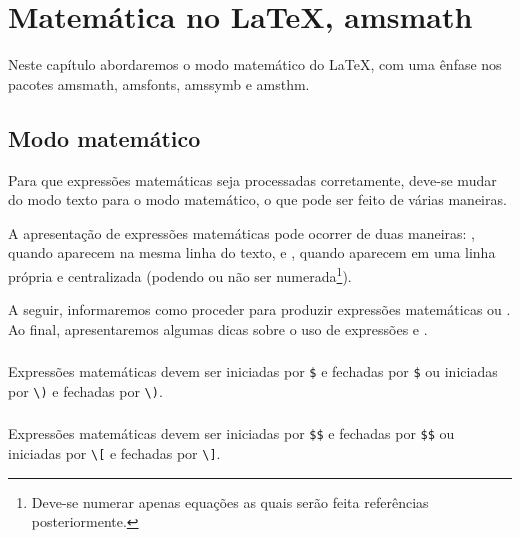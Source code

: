 \chapter{Matemática no \LaTeX, amsmath} \label{sch:math}
Neste capítulo abordaremos o modo matemático do LaTeX, com uma ênfase nos
pacotes amsmath, amsfonts, amssymb e
amsthm.

\section{Modo matemático}
Para que expressões matemáticas seja processadas corretamente, deve-se mudar do
modo texto para o modo matemático, o que pode ser feito de várias maneiras.

A apresentação de expressões matemáticas pode ocorrer de duas maneiras:
,
quando aparecem na mesma linha do texto, e , quando aparecem em uma
linha própria e centralizada (podendo ou não ser numerada\footnote{Deve-se
numerar apenas equações as quais serão feita referências posteriormente.}).

A seguir, informaremos como proceder para produzir expressões matemáticas
 ou . Ao final, apresentaremos algumas dicas
sobre o uso de expressões  e .

\subsection{}
Expressões matemáticas  devem ser iniciadas por \lstinline!$! e
fechadas por \lstinline!$! ou iniciadas por \lstinline!\)! e fechadas por
\lstinline!\)!. \\

\subsection{}
Expressões matemáticas  devem ser iniciadas por \lstinline!$$! e
fechadas por \lstinline!$$! ou iniciadas por \lstinline!\[! e fechadas por
\lstinline!\]!. \\

